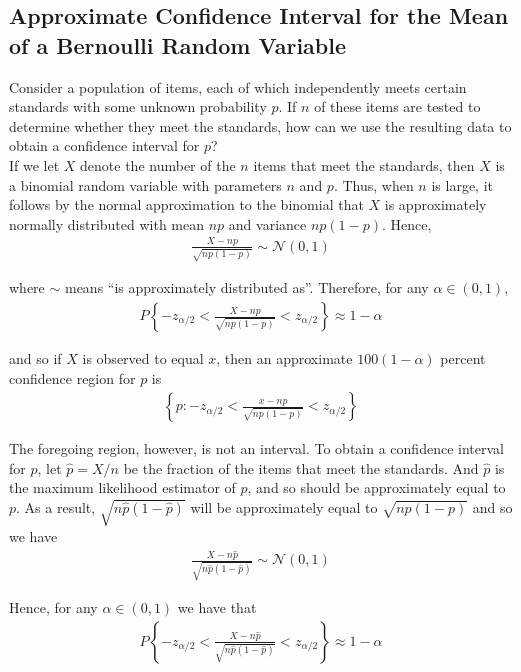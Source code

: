 \documentclass[12pt]{article}
\begin{document}
\subsection{Approximate Confidence Interval for the Mean of a Bernoulli Random Variable}

Consider a population of items, each of which independently meets certain standards with some unknown probability $p$. If $n$ of these items are tested to determine whether they meet the standards, how can we use the resulting data to obtain a confidence interval for $p$? \\

If we let $X$ denote the number of the $n$ items that meet the standards, then $X$ is a binomial random variable with parameters $n$ and $p$. Thus, when $n$ is large, it follows by the normal approximation to the binomial that $X$ is approximately normally distributed with mean $np$ and variance $np(1-p)$. Hence,
\begin{eqnarray*}
  \frac {X - np}{\sqrt {np(1-p)}} \sim \mathcal{N}(0,1)
\end{eqnarray*}

where $\sim$ means ``is approximately distributed as''. Therefore, for any $\alpha \in (0,1)$,
\begin{eqnarray*}
  P \left\{ - z_{\alpha /2} < \frac {X - np}{\sqrt {np(1-p)}}
    < z_{\alpha / 2} \right\} \approx 1 - \alpha
\end{eqnarray*}

and so if $X$ is observed to equal $x$, then an approximate $100(1 - \alpha)$ percent confidence region for $p$ is
\begin{eqnarray*}
  \left\{ p: - z_{\alpha /2} < \frac {x - np}{\sqrt {np(1-p)}}
    < z_{\alpha / 2} \right\}
\end{eqnarray*}

The foregoing region, however, is not an interval. To obtain a confidence interval for $p$, let $\hat{p} = X / n$ be the fraction of the items that meet the standards. And $\hat{p}$ is the maximum likelihood estimator of $p$, and so should be approximately equal to $p$. As a result, $\sqrt{n \hat{p}(1 - \hat{p})}$ will be approximately equal to $\sqrt{np(1-p)}$ and so we have
\begin{eqnarray*}
  \frac {X - n\hat{p}}{\sqrt {n\hat{p}(1-\hat{p})}} \sim \mathcal{N}(0,1)
\end{eqnarray*}

Hence, for any $\alpha \in (0,1)$ we have that
\begin{eqnarray*}
  P \left\{ - z_{\alpha /2} <
    \frac {X - n\hat{p}}{\sqrt {n\hat{p}(1-\hat{p})}}
    < z_{\alpha / 2} \right\} \approx 1 - \alpha
\end{eqnarray*}
\end{document}
